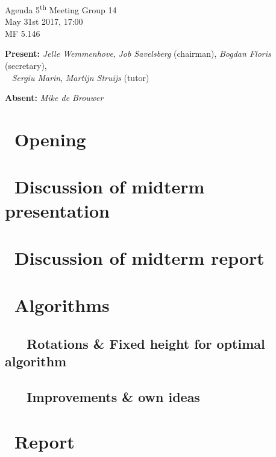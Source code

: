 \documentclass[a4paper,twoside,11pt]{article}
\title{}
\date{}
\newcommand{\ts}{\textsuperscript}
\begin{document}

\begin{center}
\Huge{Agenda 5\ts{th} Meeting Group 14}
\\\vspace*{2mm}
\Large{May 31st 2017, 17:00}
\\\vspace*{2mm}
\large{MF 5.146}
\\
\end{center}

		\textbf{Present:} \textit{Jelle Wemmenhove}, \textit{Job Savelsberg} (chairman), \textit{Bogdan Floris} (secretary), 
\\\indent\qquad\,\,\,\,\,\qquad\quad  \textit{Sergiu Marin}, \textit{Martijn Struijs} (tutor)


	    \textbf{Absent:} \textit{Mike de Brouwer} 

	    



\section{\ Opening}

\section{\ Discussion of midterm presentation}

\section{\ Discussion of midterm report}

\section{\ Algorithms}
	\subsection{\ \ \ Rotations \& Fixed height for optimal algorithm}
	\subsection{\ \ \ Improvements \& own ideas}
	
\section{\ Report}
\end{document}
